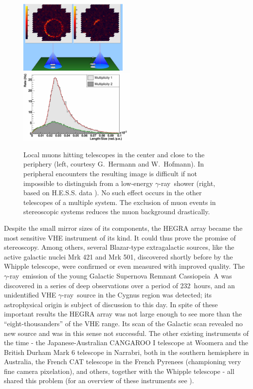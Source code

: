\documentclass{svjour3x}                     %
\newcommand{\gr}{$\gamma$-ray}
\begin{document}
\begin{figure}
  \includegraphics[width=0.48\textwidth]{MuonRings_x.eps}
  \includegraphics[width=0.52\textwidth]{MuonRejection.eps}
  \caption[Local muons]{Local muons hitting telescopes in the center and close
    to the periphery (left, courtesy G.~Hermann and W.~Hofmann).  In peripheral
    encounters the resulting image is difficult if not impossible to
    distinguish from a low-energy \gr\ shower (right, based on H.E.S.S. data
    \cite{hesstrig}).  No such effect occurs in the other telescopes of a
    multiple system. The exclusion of muon events in stereoscopic systems
    reduces the muon background drastically.}
  \label{fig:10}       %
\end{figure}
%

Despite the small mirror sizes of its components, the HEGRA array became the
most sensitive VHE instrument of its kind. It could thus prove the promise of
stereoscopy. Among others, several Blazar-type extragalactic sources, like the
active galactic nuclei Mrk 421 and Mrk 501, discovered shortly before by the
Whipple telescope, were confirmed or even measured with improved quality. The
\gr\ emission of the young Galactic Supernova Remnant Cassiopeia~A was
discovered in a series of deep observations over a period of 232~hours, and an
unidentified VHE \gr\ source in the Cygnus region was detected; its
astrophysical origin is subject of discussion to this day. In spite of these
important results the HEGRA array was not large enough to see more than the
``eight-thousanders'' of the VHE range. Its scan of the
Galactic scan revealed no new source and was in this sense not successful. The
other existing instruments of the time - the Japanese-Australian CANGAROO I
telescope at Woomera and the British Durham Mark 6 telescope in Narrabri, both
in the southern hemisphere in Australia, the French CAT telescope in the French
Pyrenees (championing very fine camera pixelation), and others, together with
the Whipple telescope - all shared this problem (for an overview of these
instruments see \cite{ong98}).
\end{document}
